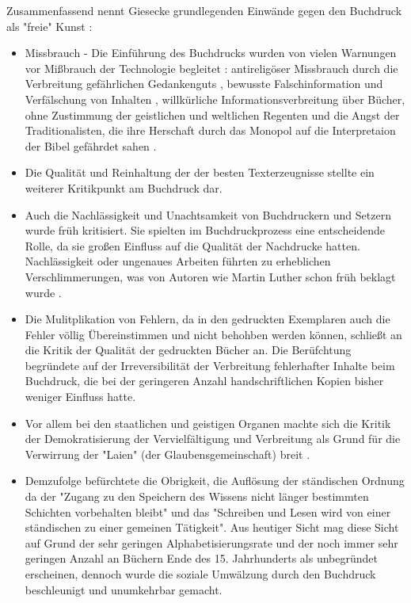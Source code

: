 Zusammenfassend nennt Giesecke grundlegenden Einwände gegen den Buchdruck als "freie" Kunst \cite{giesecke_1991_buchdruck}:
\begin{itemize}
\item Missbrauch - Die Einführung des Buchdrucks wurden von vielen Warnungen vor Mißbrauch der Technologie begleitet \cite{lange2008medienwettbewerb}: antireligöser Missbrauch durch die Verbreitung gefährlichen Gedankenguts \cite{kruse2003multimedia}, bewusste Falschinformation und Verfälschung von Inhalten \cite{sprachgeschichte_1998_besch},  willkürliche Informationsverbreitung über Bücher, ohne Zustimmung der geistlichen und weltlichen Regenten \cite{rother_2002_siebenbuergen} und die Angst der Traditionalisten, die ihre Herschaft durch das Monopol auf die Interpretaion der Bibel gefährdet sahen \cite{lange2008medienwettbewerb}.
\item Die Qualität und Reinhaltung der der besten Texterzeugnisse \cite{giesecke_1991_buchdruck} stellte ein weiterer Kritikpunkt am Buchdruck dar.
\item Auch die Nachlässigkeit und Unachtsamkeit von Buchdruckern und Setzern wurde früh kritisiert. Sie spielten im Buchdruckprozess eine entscheidende Rolle, da sie großen Einfluss auf die Qualität der Nachdrucke hatten. Nachlässigkeit oder ungenaues Arbeiten führten zu erheblichen Verschlimmerungen, was von Autoren wie Martin Luther schon früh beklagt wurde \cite{sprachgeschichte_1998_besch}.
\item Die Mulitplikation von Fehlern, da in den gedruckten Exemplaren auch die Fehler völlig Übereinstimmen und nicht behohben werden können, schließt an die Kritik der Qualität der gedruckten Bücher an. Die Berüfchtung begründete auf der Irreversibilität der Verbreitung fehlerhafter Inhalte beim Buchdruck, die bei der geringeren Anzahl handschriftlichen Kopien bisher weniger Einfluss hatte.
\item Vor allem bei den staatlichen und geistigen Organen machte sich die Kritik der Demokratisierung der Vervielfältigung und Verbreitung als Grund für die Verwirrung der "Laien" (der Glaubensgemeinschaft) breit \cite{giesecke_1991_buchdruck}.
\item Demzufolge befürchtete die Obrigkeit, die Auflösung der ständischen Ordnung da der "Zugang zu den Speichern des Wissens nicht länger bestimmten Schichten vorbehalten bleibt" und das "Schreiben und Lesen wird von einer ständischen zu einer gemeinen Tätigkeit". Aus heutiger Sicht mag diese Sicht auf Grund der sehr geringen Alphabetisierungsrate und der noch immer sehr geringen Anzahl an Büchern Ende des 15. Jahrhunderts als unbegründet erscheinen, dennoch wurde die soziale Umwälzung durch den Buchdruck beschleunigt und unumkehrbar gemacht. \cite{giesecke_1991_buchdruck}

\end{itemize}
